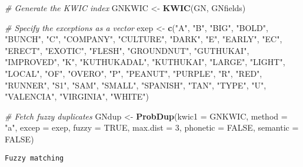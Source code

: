 \documentclass[]{article}
\newenvironment{Shaded}{\begin{snugshade}}{\end{snugshade}}
\newcommand{\CommentTok}[1]{\textcolor[rgb]{0.56,0.35,0.01}{\textit{#1}}}
\newcommand{\DataTypeTok}[1]{\textcolor[rgb]{0.13,0.29,0.53}{#1}}
\newcommand{\DecValTok}[1]{\textcolor[rgb]{0.00,0.00,0.81}{#1}}
\newcommand{\KeywordTok}[1]{\textcolor[rgb]{0.13,0.29,0.53}{\textbf{#1}}}
\newcommand{\NormalTok}[1]{#1}
\newcommand{\OtherTok}[1]{\textcolor[rgb]{0.56,0.35,0.01}{#1}}
\newcommand{\StringTok}[1]{\textcolor[rgb]{0.31,0.60,0.02}{#1}}
\begin{document}
\begin{Shaded}
\begin{Highlighting}[]
\CommentTok{# Generate the KWIC index}
\NormalTok{GNKWIC <-}\StringTok{ }\KeywordTok{KWIC}\NormalTok{(GN, GNfields)}

\CommentTok{# Specify the exceptions as a vector}
\NormalTok{exep <-}\StringTok{ }\KeywordTok{c}\NormalTok{(}\StringTok{"A"}\NormalTok{, }\StringTok{"B"}\NormalTok{, }\StringTok{"BIG"}\NormalTok{, }\StringTok{"BOLD"}\NormalTok{, }\StringTok{"BUNCH"}\NormalTok{, }\StringTok{"C"}\NormalTok{, }\StringTok{"COMPANY"}\NormalTok{, }\StringTok{"CULTURE"}\NormalTok{,}
         \StringTok{"DARK"}\NormalTok{, }\StringTok{"E"}\NormalTok{, }\StringTok{"EARLY"}\NormalTok{, }\StringTok{"EC"}\NormalTok{, }\StringTok{"ERECT"}\NormalTok{, }\StringTok{"EXOTIC"}\NormalTok{, }\StringTok{"FLESH"}\NormalTok{, }\StringTok{"GROUNDNUT"}\NormalTok{,}
         \StringTok{"GUTHUKAI"}\NormalTok{, }\StringTok{"IMPROVED"}\NormalTok{, }\StringTok{"K"}\NormalTok{, }\StringTok{"KUTHUKADAL"}\NormalTok{, }\StringTok{"KUTHUKAI"}\NormalTok{, }\StringTok{"LARGE"}\NormalTok{,}
         \StringTok{"LIGHT"}\NormalTok{, }\StringTok{"LOCAL"}\NormalTok{, }\StringTok{"OF"}\NormalTok{, }\StringTok{"OVERO"}\NormalTok{, }\StringTok{"P"}\NormalTok{, }\StringTok{"PEANUT"}\NormalTok{, }\StringTok{"PURPLE"}\NormalTok{, }\StringTok{"R"}\NormalTok{,}
         \StringTok{"RED"}\NormalTok{, }\StringTok{"RUNNER"}\NormalTok{, }\StringTok{"S1"}\NormalTok{, }\StringTok{"SAM"}\NormalTok{, }\StringTok{"SMALL"}\NormalTok{, }\StringTok{"SPANISH"}\NormalTok{, }\StringTok{"TAN"}\NormalTok{, }\StringTok{"TYPE"}\NormalTok{,}
         \StringTok{"U"}\NormalTok{, }\StringTok{"VALENCIA"}\NormalTok{, }\StringTok{"VIRGINIA"}\NormalTok{, }\StringTok{"WHITE"}\NormalTok{)}

\CommentTok{# Fetch fuzzy duplicates}
\NormalTok{GNdup <-}\StringTok{ }\KeywordTok{ProbDup}\NormalTok{(}\DataTypeTok{kwic1 =}\NormalTok{ GNKWIC, }\DataTypeTok{method =} \StringTok{"a"}\NormalTok{, }\DataTypeTok{excep =}\NormalTok{ exep, }
                 \DataTypeTok{fuzzy =} \OtherTok{TRUE}\NormalTok{, }\DataTypeTok{max.dist =} \DecValTok{3}\NormalTok{,}
                 \DataTypeTok{phonetic =} \OtherTok{FALSE}\NormalTok{, }\DataTypeTok{semantic =} \OtherTok{FALSE}\NormalTok{)}
\end{Highlighting}
\end{Shaded}

\begin{verbatim}
Fuzzy matching
\end{verbatim}
\end{document}
